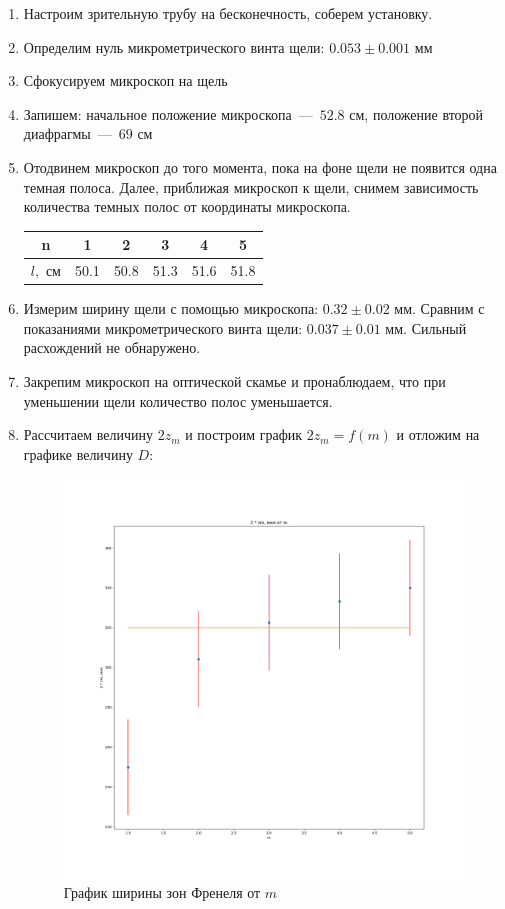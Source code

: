 \documentclass[a4paper, 12pt]{article}
\begin{document}
\begin{enumerate}
    \item Настроим зрительную трубу на бесконечность, соберем установку.
    \item Определим нуль микрометрического винта щели: $0.053 \pm 0.001$ мм
    \item Сфокусируем микроскоп на щель
    \item Запишем: начальное положение микроскопа~---~$52.8$ см, положение второй диафрагмы~---~$69$ см
    \item Отодвинем микроскоп до того момента, пока на фоне щели не появится одна темная полоса. Далее, приближая микроскоп к щели, снимем зависимость количества темных полос от координаты микроскопа.
    
    \begin{tabular}{|c|c|c|c|c|c|} \hline
        n & 1 & 2 & 3 & 4 & 5 \\ \hline
        $l, $ см & 50.1 & 50.8 & 51.3 & 51.6 & 51.8 \\ \hline
    \end{tabular}

    \item Измерим ширину щели с помощью микроскопа: $0.32 \pm 0.02$ мм. Сравним с показаниями микрометрического винта щели: $0.037 \pm 0.01$ мм. Сильный расхождений не обнаружено.
    \item Закрепим микроскоп на оптической скамье и пронаблюдаем, что при уменьшении щели количество полос уменьшается.
    \item Рассчитаем величину $2z_m$ и построим график $2z_m = f(m)$ и отложим на графике величину $D$:
    
    
    \begin{figure}[!h]
        \centering
        \includegraphics[scale=0.4]{graph1.png}
        \caption{График ширины зон Френеля от $m$}
        \label{graph1}
    \end{figure}
\end{enumerate}
\end{document}

